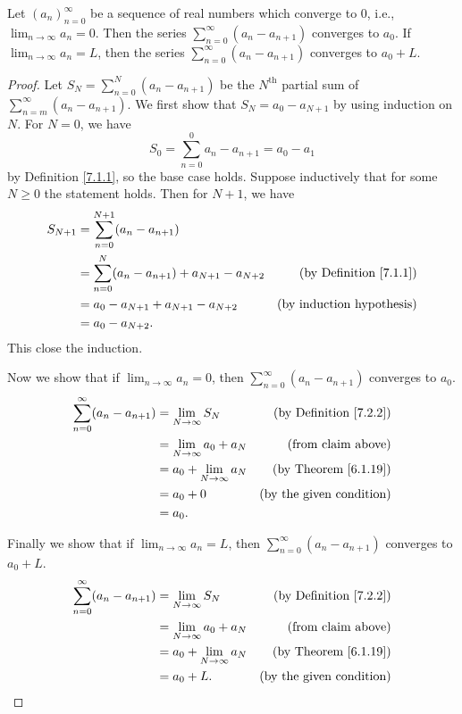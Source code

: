 \begin{lemma}\label{7.2.15}
Let \((a_n)_{n = 0}^\infty\) be a sequence of real numbers which converge to \(0\), i.e., \(\lim_{n \to \infty} a_n = 0\).
Then the series \(\sum_{n = 0}^\infty (a_n - a_{n + 1})\) converges to \(a_0\).
If \(\lim_{n \to \infty} a_n = L\), then the series \(\sum_{n = 0}^\infty (a_n - a_{n + 1})\) converges to \(a_0 + L\).
\end{lemma}

\begin{proof}
Let \(S_N = \sum_{n = 0}^N (a_n - a_{n + 1})\) be the \(N^{\text{th}}\) partial sum of \(\sum_{n = m}^\infty (a_n - a_{n + 1})\).
We first show that \(S_N = a_0 - a_{N + 1}\) by using induction on \(N\).
For \(N = 0\), we have
\[
    S_0 = \sum_{n = 0}^0 a_n - a_{n + 1} = a_0 - a_1
\]
by Definition \ref{7.1.1}, so the base case holds.
Suppose inductively that for some \(N \geq 0\) the statement holds.
Then for \(N + 1\), we have
\begin{align*}
S_{N + 1} &= \sum_{n = 0}^{N + 1} (a_n - a_{n + 1}) \\
&= \sum_{n = 0}^N (a_n - a_{n + 1}) + a_{N + 1} - a_{N + 2} & \text{(by Definition \ref{7.1.1})} \\
&= a_0 - a_{N + 1} + a_{N + 1} - a_{N + 2} & \text{(by induction hypothesis)} \\
&= a_0 - a_{N + 2}.
\end{align*}
This close the induction.

Now we show that if \(\lim_{n \to \infty} a_n = 0\), then \(\sum_{n = 0}^\infty (a_n - a_{n + 1})\) converges to \(a_0\).
\begin{align*}
\sum_{n = 0}^\infty (a_n - a_{n + 1}) &= \lim_{N \to \infty} S_N & \text{(by Definition \ref{7.2.2})} \\
&= \lim_{N \to \infty} a_0 + a_N & \text{(from claim above)} \\
&= a_0 + \lim_{N \to \infty} a_N & \text{(by Theorem \ref{6.1.19})} \\
&= a_0 + 0 & \text{(by the given condition)} \\
&= a_0.
\end{align*}

Finally we show that if \(\lim_{n \to \infty} a_n = L\), then \(\sum_{n = 0}^\infty (a_n - a_{n + 1})\) converges to \(a_0 + L\).
\begin{align*}
\sum_{n = 0}^\infty (a_n - a_{n + 1}) &= \lim_{N \to \infty} S_N & \text{(by Definition \ref{7.2.2})} \\
&= \lim_{N \to \infty} a_0 + a_N & \text{(from claim above)} \\
&= a_0 + \lim_{N \to \infty} a_N & \text{(by Theorem \ref{6.1.19})} \\
&= a_0 + L. & \text{(by the given condition)}
\end{align*}
\end{proof}

